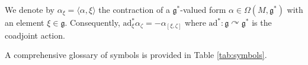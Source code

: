 \documentclass[pdftex]{sigma}
\numberwithin{equation}{section}
\newcommand{\g}{\mathfrak{g}}
\newcommand{\ad}{\mathrm{ad}}
\begin{document}
We denote by $\alpha_\xi=\langle\alpha,\xi\rangle$ the contraction of a $\g^*$-valued form $\alpha\in\Omega(M,\g^*)$ with an element $\xi\in\g$. Consequently, $\ad_\xi^*\alpha_\zeta = -\alpha_{[\xi,\zeta]}$ where $\ad^*\colon \g\curvearrowright\g^*$ is the coadjoint action.

A comprehensive glossary of symbols is provided in Table \ref{tab:symbols}.

\end{document}
